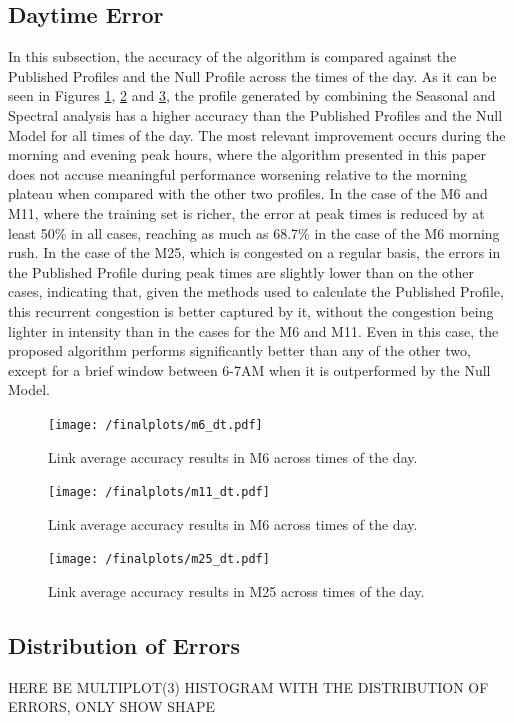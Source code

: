 \documentclass[conference]{IEEEtran}
\begin{document}
\subsection{Daytime Error}
In this subsection, the accuracy of the algorithm is compared against the Published Profiles and the Null Profile across the times of the day.
As it can be seen in Figures \ref{fig:m6daytime}, \ref{fig:m11daytime} and \ref{fig:m25daytime}, the profile generated by combining the Seasonal and Spectral analysis has a higher accuracy than the Published Profiles and the Null Model for all times of the day. The most relevant improvement occurs during the morning and evening peak hours, where the algorithm presented in this paper does not accuse meaningful performance worsening relative to the morning plateau when compared with the other two profiles. 
In the case of the M6 and M11, where the training set is richer, the error at peak times is reduced by at least 50\% in all cases, reaching as much as 68.7\% in the case of the M6 morning rush.
In the case of the M25, which is congested on a regular basis, the errors in the Published Profile during peak times are slightly lower than on the other cases, indicating that, given the methods used to calculate the Published Profile, this recurrent congestion is better captured by it, without the congestion being lighter in intensity than in the cases for the M6 and M11. 
Even in this case, the proposed algorithm performs significantly better than any of the other two, except for a brief window between 6-7AM when it is outperformed by the Null Model.
\begin{figure}[htbp]
	\centering
		\texttt{[image: /finalplots/m6\_dt.pdf]}
	\caption{Link average accuracy results in M6 across times of the day.}
	\label{fig:m6daytime}
\end{figure}

\begin{figure}[htbp]
	\centering
	\texttt{[image: /finalplots/m11\_dt.pdf]}
	\caption{Link average accuracy results in M6 across times of the day.}
	\label{fig:m11daytime}
\end{figure}

\begin{figure}[htbp]
	\centering
	\texttt{[image: /finalplots/m25\_dt.pdf]}
	\caption{Link average accuracy results in M25 across times of the day.}
	\label{fig:m25daytime}
\end{figure}
\subsection{Distribution of Errors}
HERE BE MULTIPLOT(3) HISTOGRAM WITH THE DISTRIBUTION OF ERRORS, ONLY SHOW SHAPE
\end{document}
